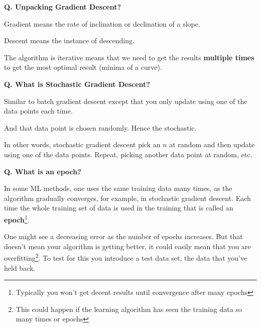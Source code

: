 \begin{frame}[fragile]{\textbf{Q. Unpacking Gradient Descent?}}
  \begin{wideitemize}
    \item Gradient means the rate of inclination or declination of a slope.
    \item Descent means the instance of descending.
    \item The algorithm is iterative means that we need to get the results
    \textbf{multiple times} to get the most optimal result (minima of a curve).
  \end{wideitemize}
\end{frame}

\begin{frame}[fragile]{\textbf{Q. What is Stochastic Gradient Descent?}}
  \begin{wideitemize}
    \item Similar to batch gradient descent except that you only update
    using one of the data points each time.
    \item And that data point is chosen randomly. Hence the stochastic.
    \item In other words, stochastic gradient descent pick an $n$ at random
    and then update using one of the data points. Repeat, picking another
    data point at random, etc.
  \end{wideitemize}
\end{frame}

\begin{frame}[fragile]{\textbf{Q. What is an epoch?}}
  \begin{wideitemize}
    \item In some ML methods, one uses the same training data many times,
    as the algorithm gradually converges, for example, in stochastic gradient
    descent. Each time the whole training set of data is used in the training
    that is called an \textbf{epoch}\footnote{Typically you won't
    get decent results until convergence after many epochs}.
    \item One might see a decreasing error as the number of epochs increases.
    But that doesn't mean your algorithm is getting better, it could easily
    mean that you are overfitting\footnote{This could happen if the learning
    algorithm has seen the training data so many times or epochs}. To test for
    this you introduce a test data set, the data that you've held back.
  \end{wideitemize}
\end{frame}

